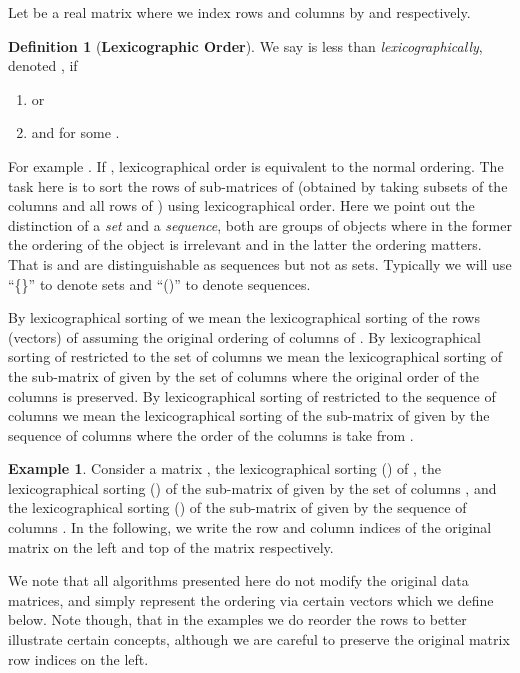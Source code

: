 \documentclass[a4paper,10pt,reqno]{amsart}
\theoremstyle{definition}
\newtheorem{definition}{Definition}
\newtheorem{example}{Example}
\begin{document}
Let  be a real matrix where we index rows and columns by
 and  respectively. 

\begin{definition}[\bf Lexicographic Order]
We say  is less
than  \emph{lexicographically}, denoted , if 
\begin{enumerate}
    \item  or 
    \item  and  for some . 
\end{enumerate}
\end{definition}
For example .  If , lexicographical
order is equivalent to the normal ordering.  The task here is to sort
the rows of sub-matrices of  (obtained by taking subsets of the columns and
all rows of ) using lexicographical order. Here we point out the distinction
of a \emph{set} and a \emph{sequence}, both are groups of objects where in the
former the ordering of the object is irrelevant and in the latter the ordering
matters. That is  and  are distinguishable as sequences but
not as sets.  Typically we will use ``\{\}'' to denote sets and ``()'' to
denote sequences.

By lexicographical sorting of  we mean the
lexicographical sorting of the rows (vectors) of  assuming the original
ordering of columns of . By lexicographical sorting of  restricted to the
set of columns  we mean the lexicographical sorting of the sub-matrix of 
given by the set of columns  where the original order of the columns is preserved.
By lexicographical sorting of  restricted to the sequence of columns  we
mean the lexicographical sorting of the sub-matrix of  given by the sequence
of columns  where the order of the columns is take from .

\begin{example}
Consider a matrix , the lexicographical sorting () of ,
the lexicographical sorting () of the sub-matrix of  given by the set
of columns , and the lexicographical sorting () of the
sub-matrix of  given by the sequence of columns . In the following,
we write the row and column indices of the original matrix  on the 
left and top of the matrix respectively.

\end{example}

We note that all algorithms presented here do not modify the original
data matrices, and simply represent the ordering via certain vectors
which we define below. Note though, that in the examples we do reorder
the rows to better illustrate certain concepts, although we are careful
to preserve the original matrix row indices on the left.
\end{document}
